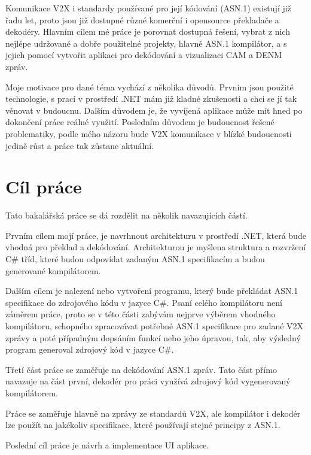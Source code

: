 Komunikace V2X i standardy používané pro její kódování (ASN.1) existují
již řadu let, proto jsou již dostupné různé komerční i opensource překladače
a dekodéry. Hlavním cílem mé práce je porovnat dostupná řešení, vybrat z nich
nejlépe udržované a dobře použitelné projekty, hlavně ASN.1 kompilátor, a s jejich
pomocí vytvořit aplikaci pro dekódování a vizualizaci CAM a DENM zpráv.

Moje motivace pro dané téma vychází z několika důvodů. Prvním jsou použité
technologie, s prací v prostředí .NET mám již kladné zkušenosti a chci
se jí tak věnovat v budoucnu. Dalším důvodem je, že vyvíjená aplikace může
mít hned po dokončení práce reálné využití. Posledním důvodem je budoucnost
řešené problematiky, podle mého názoru bude V2X komunikace v blízké
budoucnosti jedině růst a práce tak zůstane aktuální.

\chapter{Cíl práce}

Tato bakalářská práce se dá rozdělit na několik navazujících částí.

Prvním cílem mojí práce, je navrhnout architekturu v prostředí .NET, která bude vhodná pro překlad a dekódování. Architekturou je myšlena struktura a rozvržení C# tříd, které budou odpovídat zadaným ASN.1 specifikacím a budou generované kompilátorem.

Dalším cílem je nalezení nebo vytvoření programu, který bude překládat ASN.1 specifikace do zdrojového kódu v jazyce C#. Psaní celého kompilátoru není záměrem práce, proto se v této části zabývám nejprve výběrem vhodného kompilátoru, schopného zpracovávat potřebné ASN.1 specifikace pro zadané V2X zprávy a poté případným dopsáním funkcí nebo jeho úpravou, tak, aby výsledný program generoval zdrojový kód v jazyce C#.

Třetí část práce se zaměřuje na dekódování ASN.1 zpráv. Tato část přímo navazuje na část první, dekodér pro práci využívá zdrojový kód vygenerovaný kompilátorem.

Práce se zaměřuje hlavně na zprávy ze standardů V2X, ale kompilátor i dekodér lze použít na jakékoliv specifikace, které používají stejné principy z ASN.1.

Poslední cíl práce je návrh a implementace UI aplikace.




